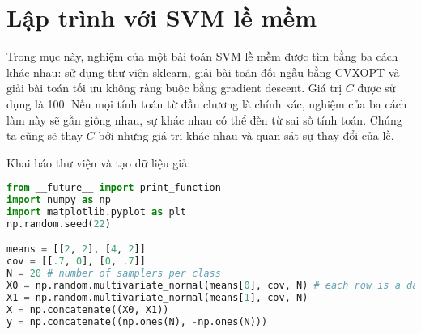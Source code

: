  
 
 
\section{Lập trình với SVM lề mềm}
Trong mục này, nghiệm của một bài toán SVM lề mềm được tìm bằng ba cách khác nhau: sử dụng thư viện sklearn, giải bài toán đối ngẫu
bằng CVXOPT và giải bài toán tối ưu không ràng buộc bằng gradient
descent. Giá trị $C$ được sử dụng là 100.
Nếu mọi tính toán từ đầu chương là chính xác, nghiệm của ba cách làm này sẽ
gần giống nhau, sự khác nhau có thể đến từ sai số tính toán.
Chúng ta cũng sẽ thay $C$ bởi những giá trị khác nhau và quan sát sự thay đổi của lề. 
 
 
 
Khai báo thư viện và tạo dữ liệu giả:
 
\begin{lstlisting}[language=Python]
from __future__ import print_function
import numpy as np 
import matplotlib.pyplot as plt
np.random.seed(22)

means = [[2, 2], [4, 2]]
cov = [[.7, 0], [0, .7]]
N = 20 # number of samplers per class 
X0 = np.random.multivariate_normal(means[0], cov, N) # each row is a data point 
X1 = np.random.multivariate_normal(means[1], cov, N)
X = np.concatenate((X0, X1))
y = np.concatenate((np.ones(N), -np.ones(N)))
\end{lstlisting}

